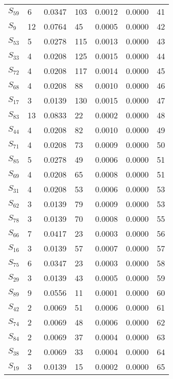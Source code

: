 \begin{xltabular}{\textwidth}{XPPPPPP}
  $S_{59}$ & 6 & 0.0347 & 103 & 0.0012 & 0.0000 & 41 \\ 
  $S_{9}$ & 12 & 0.0764 & 45 & 0.0005 & 0.0000 & 42 \\ 
  $S_{53}$ & 5 & 0.0278 & 115 & 0.0013 & 0.0000 & 43 \\ 
  $S_{33}$ & 4 & 0.0208 & 125 & 0.0015 & 0.0000 & 44 \\ 
  $S_{72}$ & 4 & 0.0208 & 117 & 0.0014 & 0.0000 & 45 \\ 
  $S_{68}$ & 4 & 0.0208 & 88 & 0.0010 & 0.0000 & 46 \\ 
  $S_{17}$ & 3 & 0.0139 & 130 & 0.0015 & 0.0000 & 47 \\ 
  $S_{83}$ & 13 & 0.0833 & 22 & 0.0002 & 0.0000 & 48 \\ 
  $S_{44}$ & 4 & 0.0208 & 82 & 0.0010 & 0.0000 & 49 \\ 
  $S_{71}$ & 4 & 0.0208 & 73 & 0.0009 & 0.0000 & 50 \\ 
  $S_{85}$ & 5 & 0.0278 & 49 & 0.0006 & 0.0000 & 51 \\ 
  $S_{69}$ & 4 & 0.0208 & 65 & 0.0008 & 0.0000 & 51 \\ 
  $S_{31}$ & 4 & 0.0208 & 53 & 0.0006 & 0.0000 & 53 \\ 
  $S_{62}$ & 3 & 0.0139 & 79 & 0.0009 & 0.0000 & 53 \\ 
  $S_{78}$ & 3 & 0.0139 & 70 & 0.0008 & 0.0000 & 55 \\ 
  $S_{66}$ & 7 & 0.0417 & 23 & 0.0003 & 0.0000 & 56 \\ 
  $S_{16}$ & 3 & 0.0139 & 57 & 0.0007 & 0.0000 & 57 \\ 
  $S_{75}$ & 6 & 0.0347 & 23 & 0.0003 & 0.0000 & 58 \\ 
  $S_{29}$ & 3 & 0.0139 & 43 & 0.0005 & 0.0000 & 59 \\ 
  $S_{89}$ & 9 & 0.0556 & 11 & 0.0001 & 0.0000 & 60 \\ 
  $S_{42}$ & 2 & 0.0069 & 51 & 0.0006 & 0.0000 & 61 \\ 
  $S_{74}$ & 2 & 0.0069 & 48 & 0.0006 & 0.0000 & 62 \\ 
  $S_{84}$ & 2 & 0.0069 & 37 & 0.0004 & 0.0000 & 63 \\ 
  $S_{38}$ & 2 & 0.0069 & 33 & 0.0004 & 0.0000 & 64 \\ 
  $S_{19}$ & 3 & 0.0139 & 15 & 0.0002 & 0.0000 & 65 \\ 

\end{xltabular}
